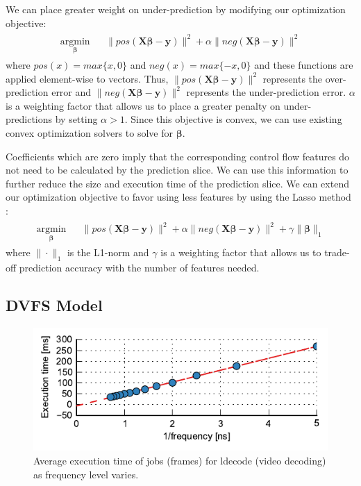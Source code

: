 We can place greater weight on under-prediction by modifying our optimization objective:
\begin{align*}
\begin{aligned}
  \underset{\boldsymbol{\beta}}{\text{argmin}} & & \|pos(\textbf{X}\boldsymbol{\beta} - \textbf{y})\|^2 + \alpha \|neg(\textbf{X}\boldsymbol{\beta} - \textbf{y})\|^2
\end{aligned}
\end{align*}
where $pos(x) = max\{x, 0\}$ and $neg(x) = max\{-x, 0\}$ and these functions are applied
element-wise to vectors. Thus, $\|pos(\textbf{X}\boldsymbol{\beta} -
\textbf{y})\|^2$ represents the over-prediction error and
$\|neg(\textbf{X}\boldsymbol{\beta} - \textbf{y})\|^2$ represents the
under-prediction error. $\alpha$ is a weighting factor that allows us to place a
greater penalty on under-predictions by setting $\alpha > 1$.
Since this objective is convex, we can use existing convex optimization solvers
to solve for $\boldsymbol{\beta}$.

Coefficients which are zero imply that the corresponding control flow features
do not need to be calculated by the prediction slice. We can use this
information to further reduce the size and execution time of the prediction
slice. We can extend our optimization objective to favor using less features
by using the Lasso method \cite{lasso-jrss96}:
\begin{align*}
\begin{aligned}
  \underset{\boldsymbol{\beta}}{\text{argmin}} & & \|pos(\textbf{X}\boldsymbol{\beta} - \textbf{y})\|^2 + \alpha \|neg(\textbf{X}\boldsymbol{\beta} - \textbf{y})\|^2 + \gamma \|\boldsymbol{\beta}\|_1
\end{aligned}
\end{align*}
where $\|\cdot\|_1$ is the L1-norm and $\gamma$ is a weighting factor that
allows us to trade-off prediction accuracy with the number of features needed.

\subsection{DVFS Model}
\label{sec:prediction.dvfs}

\begin{figure}
  \begin{center}
    \includegraphics{exec_time_prediction/figs/dvfs_linearity.pdf}
    \caption{Average execution time of jobs (frames) for ldecode (video
    decoding) as frequency level varies.}
    \label{fig:prediction.dvfs_linearity}
  \end{center}
\end{figure}

